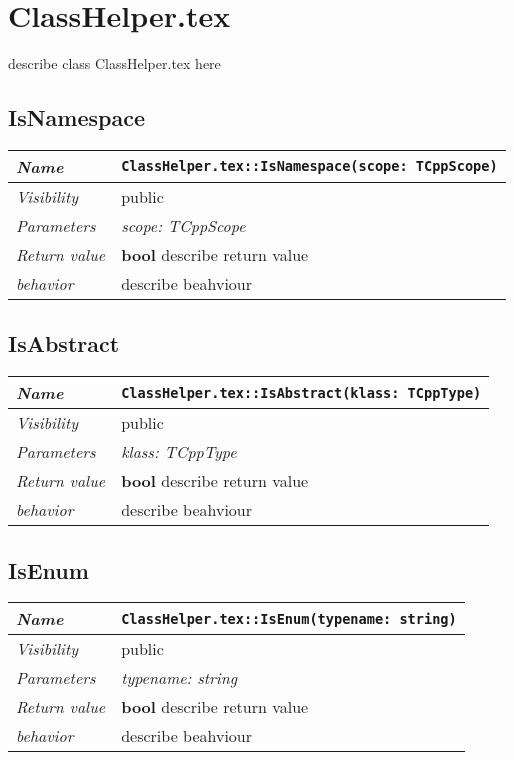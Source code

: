 \chapter{ClassHelper.tex}
describe class ClassHelper.tex here
\section{IsNamespace}
\begin{longtable}{p{3cm} @{\hskip 1cm} p{12cm}}
 \hline
\textit{Name} & \texttt{ClassHelper.tex::IsNamespace(scope: TCppScope)}\\
\hline
 \textit{Visibility} & public\\
\hline
\textit{Parameters} & \textit{scope: TCppScope}\\
\hline
\textit{Return value} & \textbf{ bool} describe return value\\
  \hline
 \textit{behavior} & describe beahviour \\
\hline
\end{longtable} \pagebreak
 \section{IsAbstract}
\begin{longtable}{p{3cm} @{\hskip 1cm} p{12cm}}
 \hline
\textit{Name} & \texttt{ClassHelper.tex::IsAbstract(klass: TCppType)}\\
\hline
 \textit{Visibility} & public\\
\hline
\textit{Parameters} & \textit{klass: TCppType}\\
\hline
\textit{Return value} & \textbf{ bool} describe return value\\
  \hline
 \textit{behavior} & describe beahviour \\
\hline
\end{longtable} \pagebreak
 \section{IsEnum}
\begin{longtable}{p{3cm} @{\hskip 1cm} p{12cm}}
 \hline
\textit{Name} & \texttt{ClassHelper.tex::IsEnum(typename: string)}\\
\hline
 \textit{Visibility} & public\\
\hline
\textit{Parameters} & \textit{typename: string}\\
\hline
\textit{Return value} & \textbf{ bool} describe return value\\
  \hline
 \textit{behavior} & describe beahviour \\
\hline
\end{longtable} \pagebreak
